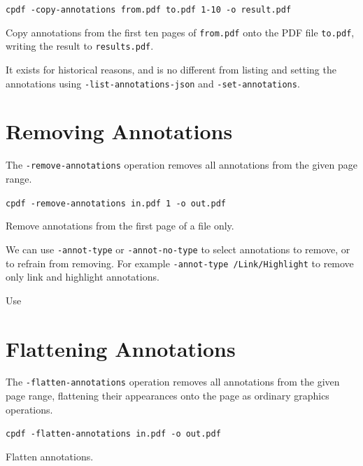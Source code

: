 \documentclass{book}
\begin{document}
  \begin{framed}
    \noindent\small\verb!cpdf -copy-annotations from.pdf to.pdf 1-10 -o result.pdf !
    
    \vspace{2.5mm}
    \noindent Copy annotations from the first ten pages of \texttt{from.pdf}
onto the PDF file \texttt{to.pdf}, writing the result to \texttt{results.pdf}.

  \end{framed}

\noindent It exists for historical reasons, and is no different from listing and setting the annotations using \texttt{-list-annotations-json} and \texttt{-set-annotations}. 

  \section{Removing Annotations}
  The \texttt{-remove-annotations} operation removes all annotations from the
given page range.

  \begin{framed}
    \noindent\small\verb!cpdf -remove-annotations in.pdf 1 -o out.pdf!
    
    \vspace{2.5mm}
    \noindent Remove annotations from the first page of a file only.
  \end{framed}

We can use \texttt{-annot-type} or \texttt{-annot-no-type} to select annotations to remove, or to refrain from removing. For example \texttt{-annot-type /Link/Highlight} to remove only link and highlight annotations.

\noindent Use

  \section{Flattening Annotations}
  The \texttt{-flatten-annotations} operation removes all annotations from the
given page range, flattening their appearances onto the page as ordinary graphics operations.

  \begin{framed}
    \noindent\small\verb!cpdf -flatten-annotations in.pdf -o out.pdf!
    
    \vspace{2.5mm}
    \noindent Flatten annotations.
  \end{framed}
\end{document}
